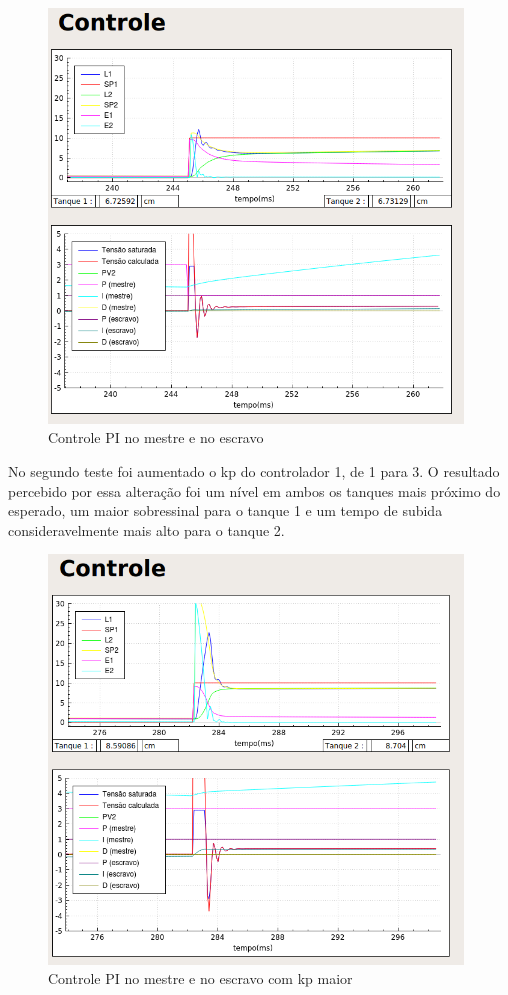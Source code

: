 \documentclass[a4paper,12pt]{article}
\begin{document}
\begin{figure}[!h]
\centering
\includegraphics[width=11cm]{ImagensLab4/1.png}
\caption{Controle PI no mestre e no escravo}
\label{img1}
\end{figure}


No segundo teste foi aumentado o kp do controlador 1, de 1 para 3. O resultado percebido por essa alteração foi um nível em ambos os tanques mais próximo do esperado, um maior sobressinal para o tanque 1 e um tempo de subida consideravelmente mais alto para o tanque 2.
\newpage
\begin{figure}[!h]
\centering
\includegraphics[width=11cm]{ImagensLab4/0.png}
\caption{Controle PI no mestre e no escravo com kp maior}
\label{img1}
\end{figure}
\end{document}

